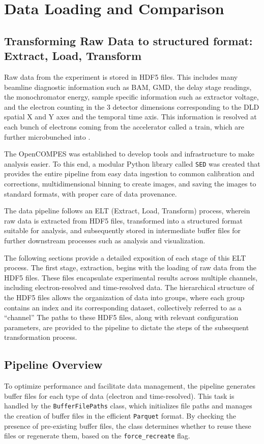 \chapter{Data Loading and Comparison}
\section{Transforming Raw Data to structured format: Extract, Load, Transform}\label{sec:elt}
Raw data from the experiment is stored in \gls{HDF5} files. This includes many \gls{beamline} diagnostic information such as \gls{BAM}, \gls{GMD}, the delay stage readings, the monochromator energy, sample specific information such as extractor voltage, and the electron counting in the 3 detector dimensions corresponding to the \gls{DLD} spatial X and Y axes and the temporal time axis. This information is resolved at each bunch of electrons coming from the accelerator called a \gls{train}, which are further microbunched into .

The \gls{OpenCOMPES} was established to develop tools and infrastructure to make analysis easier. To this end, a modular Python library called \texttt{\gls{SED}} was created that provides the entire pipeline from easy data ingestion to common calibration and corrections, multidimensional binning to create images, and saving the images to standard formats, with proper care of data provenance.

The data pipeline follows an ELT (Extract, Load, Transform) process, wherein raw data is extracted from \gls{HDF5} files, transformed into a structured format suitable for analysis, and subsequently stored in intermediate buffer files for further downstream processes such as analysis and visualization.

The following sections provide a detailed exposition of each stage of this ELT process. The first stage, extraction, begins with the loading of raw data from the \gls{HDF5} files. These files encapsulate experimental results across multiple channels, including electron-resolved and time-resolved data. The hierarchical structure of the \gls{HDF5} files allows the organization of data into groups, where each group contains an index and its corresponding dataset, collectively referred to as a “channel” The paths to these \gls{HDF5} files, along with relevant configuration parameters, are provided to the pipeline to dictate the steps of the subsequent transformation process.

\section*{Pipeline Overview}
To optimize performance and facilitate data management, the pipeline generates buffer files for each type of data (electron and time-resolved). This task is handled by the \texttt{BufferFilePaths} class, which initializes file paths and manages the creation of buffer files in the efficient \texttt{Parquet} format. By checking the presence of pre-existing buffer files, the class determines whether to reuse these files or regenerate them, based on the \texttt{force\_recreate} flag.

